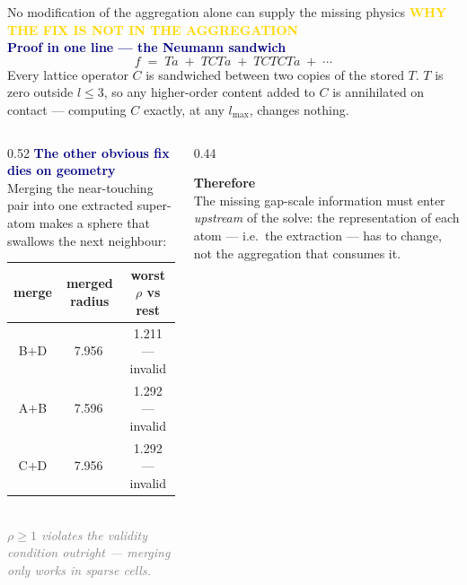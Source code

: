\documentclass[10pt,aspectratio=169]{beamer}
\newcommand{\kicker}[1]{{\footnotesize\bfseries\textcolor{gold}{#1}}\\[-0.4ex]}
\newcommand{\um}{\,\text{\textmu m}}
\begin{document}
\begin{frame}{No modification of the aggregation alone can supply the missing physics}
  \kicker{WHY THE FIX IS NOT IN THE AGGREGATION}
  \textcolor{navy}{\textbf{Proof in one line --- the Neumann sandwich}}
  \begin{equation*}
    f \;=\; T a \;+\; T C T a \;+\; T C T C T a \;+\; \cdots
  \end{equation*}
  {\small Every lattice operator $C$ is sandwiched between two copies of the stored $T$.
  $T$ is zero outside $l \le 3$, so any higher-order content added to $C$ is annihilated on contact ---
  computing $C$ exactly, at any $l_{\max}$, changes nothing.}
  \vspace{1ex}
  \begin{columns}[t]
    \begin{column}{0.52\textwidth}
      \textcolor{navy}{\textbf{The other obvious fix dies on geometry}}\\
      {\footnotesize Merging the near-touching pair into one extracted super-atom makes a sphere that swallows the next neighbour:}\\[0.5ex]
      \begin{center}\footnotesize
      \begin{tabular}{@{}ccc@{}}
        \toprule
        merge & merged radius & worst $\rho$ vs rest \\
        \midrule
        B$+$D & 7.956\um & \textcolor{bad}{1.211 --- invalid} \\
        A$+$B & 7.596\um & \textcolor{bad}{1.292 --- invalid} \\
        C$+$D & 7.956\um & \textcolor{bad}{1.292 --- invalid} \\
        \bottomrule
      \end{tabular}\\
      {\scriptsize\textit{\textcolor{gray}{$\rho \ge 1$ violates the validity condition outright --- merging only works in sparse cells.}}}
      \end{center}
    \end{column}
    \begin{column}{0.44\textwidth}
      \colorbox{cardgold}{\parbox{0.95\textwidth}{\small\textbf{\textcolor{golddk}{Therefore}}\\[0.5ex]
      The missing gap-scale information must enter \emph{upstream} of the solve:
      the representation of each atom --- i.e.\ the extraction --- has to change,
      not the aggregation that consumes it.}}
    \end{column}
  \end{columns}
\end{frame}
\end{document}
